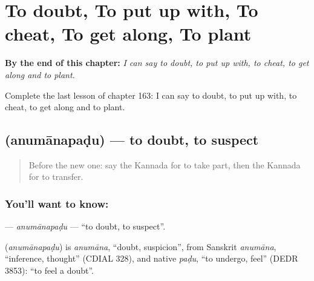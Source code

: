 
\chapter{To doubt, To put up with, To cheat, To get along, To plant}
\label{ch:ka-to-doubt-to-put-up-with-to-cheat-to-get-along-to-plant}

\begin{chapteropening}
\textbf{By the end of this chapter:} \emph{I can say to doubt, to put up with, to cheat, to get along and to plant.}

Complete the last lesson of chapter 163: I can say to doubt, to put up with, to cheat, to get along and to plant.
\end{chapteropening}

\section[\texorpdfstring{\kn{ಅನುಮಾನಪಡು} (anumānapaḍu)}{ಅನುಮಾನಪಡು (anumānapaḍu)}]{ (anumānapaḍu) — to doubt, to suspect}

\label{lesson:KA-C163-anumanapadu}



\begin{quote}
Before the new one: say the Kannada for to take part, then the Kannada for to transfer.
\end{quote}

\subsection*{You'll want to know: }
\textbf{} — \emph{anumānapaḍu} — \textquotedblleft{}to doubt, to suspect\textquotedblright{}.

\begin{cousinweb}
\textbf{} (\emph{anumānapaḍu}) is \emph{anumāna}, \textquotedblleft{}doubt, suspicion\textquotedblright{}, from Sanskrit \emph{anumāna}, \textquotedblleft{}inference, thought\textquotedblright{} (CDIAL 328), and native \emph{paḍu}, \textquotedblleft{}to undergo, feel\textquotedblright{} (DEDR 3853): \textquotedblleft{}to feel a doubt\textquotedblright{}.
\end{cousinweb}

